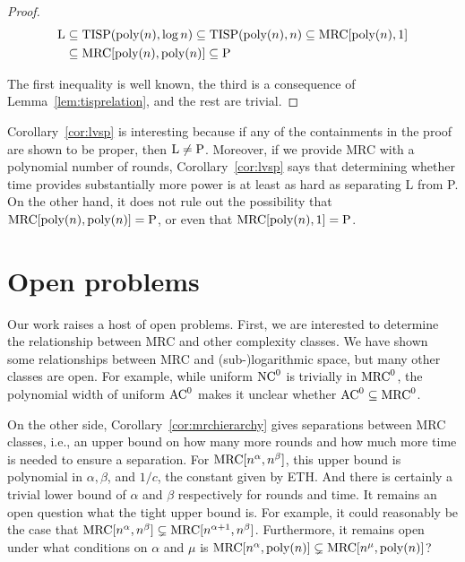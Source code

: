 \documentclass[11pt]{article}
\theoremstyle{definition}
\theoremstyle{remark}
\newcommand{\mrc}{\textup{MRC}}
\newcommand{\TISP}{\textup{TISP}}
\renewcommand{\P}{\textup{P}}
\renewcommand{\L}{\textup{L}}
\begin{document}
\begin{proof}
\begin{align*}	\L &\subseteq \TISP(\textup{poly}(n), \log n) \subseteq
\TISP(\textup{poly}(n), n) \subseteq \mrc[\textup{poly}(n), 1] \\ &\subseteq
\mrc[\textup{poly}(n), \textup{poly}(n)] \subseteq \P \end{align*}

The first inequality is well known, the third is a consequence of
Lemma~\ref{lem:tisprelation}, and the rest are trivial.
\end{proof}

Corollary~\ref{cor:lvsp} is interesting because if any of the containments in
the proof are shown to be proper, then $\L \neq \P$. Moreover, if we provide
MRC with a polynomial number of rounds, Corollary~\ref{cor:lvsp} says that
determining whether time provides substantially more power is at least as hard
as separating L from P. On the other hand, it does not rule out the possibility
that $\mrc[\textup{poly}(n), \textup{poly}(n)] = \P$, or even that
$\mrc[\textup{poly}(n), 1] = \P$.

\section{Open problems}\label{sec:openproblems}

Our work raises a host of open problems. First, we are interested to determine
the relationship between MRC and other complexity classes. We have shown some
relationships between MRC and (sub-)logarithmic space, but many other classes
are open. For example, while uniform $\textup{NC}^0$ is trivially in $\mrc^0$,
the polynomial width of uniform $\textup{AC}^0$ makes it unclear whether
$\textup{AC}^0 \subseteq \mrc^0$.

On the other side, Corollary~\ref{cor:mrchierarchy} gives separations between
MRC classes, i.e., an upper bound on how many more rounds and how much more time
is needed to ensure a separation. For $\mrc[n^\alpha, n^\beta]$, this upper
bound is polynomial in $\alpha, \beta$, and $1/c$, the constant given by ETH.
And there is certainly a trivial lower bound of $\alpha$ and $\beta$
respectively for rounds and time. It remains an open question what the tight
upper bound is. For example, it could reasonably be the case that
$\mrc[n^\alpha,n^\beta]\subsetneq\mrc[n^{\alpha+1},n^{\beta}]$. Furthermore, it
remains open under what conditions on $\alpha$ and $\mu$ is $\mrc[n^\alpha,
\text{poly}(n)] \subsetneq \mrc[n^\mu, \text{poly}(n)]$?
\end{document}
